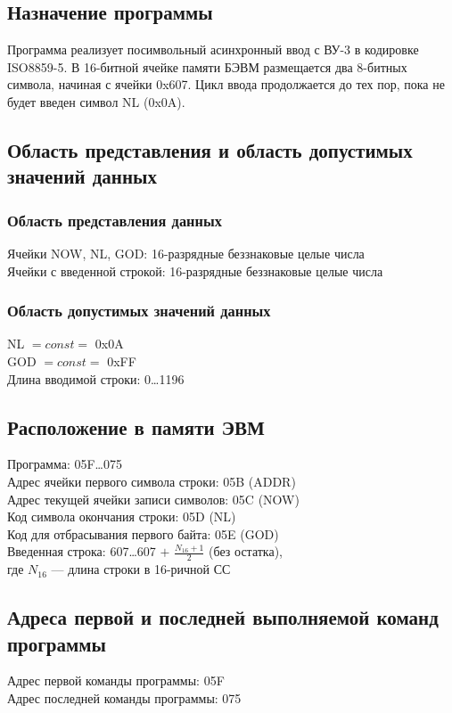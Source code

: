 \subsection{Назначение программы}
Программа реализует посимвольный асинхронный ввод с ВУ-3 в кодировке ISO8859-5. В 16-битной ячейке памяти БЭВМ размещается два 8-битных символа, начиная с ячейки 0x607. Цикл ввода продолжается до тех пор, пока не будет введен символ NL (0x0A).

\subsection{Область представления и область допустимых значений данных}
\subsubsection{Область представления данных}
\noindent Ячейки NOW, NL, GOD: 16-разрядные беззнаковые целые числа\\
Ячейки с введенной строкой: 16-разрядные беззнаковые целые числа

\subsubsection{Область допустимых значений данных}
\noindent NL $=const=$ 0x0A\\
GOD $=const=$ 0xFF\\
Длина вводимой строки: 0\ldots1196

\subsection{Расположение в памяти ЭВМ}
\noindent Программа: 05F\ldots075\\
Адрес ячейки первого символа строки: 05B (ADDR)\\
Адрес текущей ячейки записи символов: 05C (NOW)\\
Код символа окончания строки: 05D (NL)\\
Код для отбрасывания первого байта: 05E (GOD)\\
Введенная строка: 607\ldots607 $+$ $\frac{N_{16}+1}{2}$ (без остатка),\\где $N_{16}$ --- длина строки в 16-ричной СС

\subsection{Адреса первой и последней выполняемой команд программы}
\noindent Адрес первой команды программы: 05F\\
Адрес последней команды программы: 075

